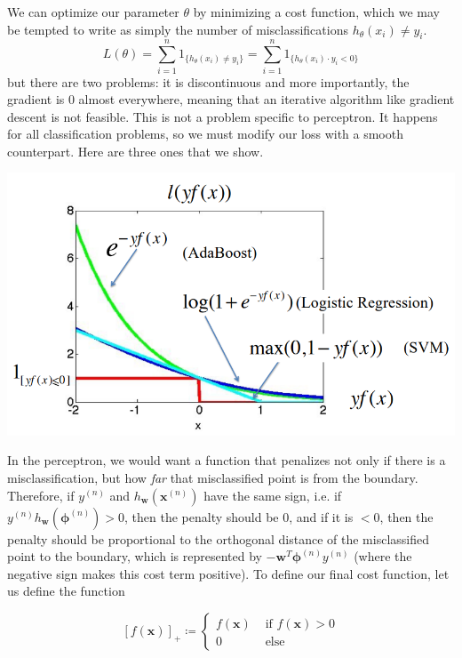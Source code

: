 \documentclass{article}
\theoremstyle{definition}
\begin{document}
  We can optimize our parameter $\theta$ by minimizing a cost function, which we may be tempted to write as simply the number of misclassifications $h_\theta (x_i) \neq y_i$. 
  \[L(\theta) = \sum_{i=1}^n 1_{\{h_\theta (x_i) \neq y_i\}} = \sum_{i=1}^n 1_{\{h_\theta (x_i) \cdot y_i < 0\}}\]
  but there are two problems: it is discontinuous and more importantly, the gradient is $0$ almost everywhere, meaning that an iterative algorithm like gradient descent is not feasible. This is not a problem specific to perceptron. It happens for all classification problems, so we must modify our loss with a smooth counterpart. Here are three ones that we show. 
  \begin{center}
    \includegraphics[scale=0.35]{img/loss_functions_class.png}
  \end{center}

  In the perceptron, we would want a function that penalizes not only if there is a misclassification, but how \textit{far} that misclassified point is from the boundary. Therefore, if $y^{(n)}$ and $h_\mathbf{w} (\mathbf{x}^{(n)})$ have the same sign, i.e. if $y^{(n)} h_\mathbf{w} (\boldsymbol{\phi}^{(n)}) > 0$, then the penalty should be $0$, and if it is $< 0$, then the penalty should be proportional to the orthogonal distance of the misclassified point to the boundary, which is represented by $-\mathbf{w}^T \boldsymbol{\phi}^{(n)} y^{(n)}$ (where the negative sign makes this cost term positive). To define our final cost function, let us define the function 

    \[[f(\mathbf{x})]_+ \coloneqq \begin{cases} f(\mathbf{x}) & \text{ if } f(\mathbf{x}) > 0 \\ 0 & \text{ else } \end{cases}\]
\end{document}
